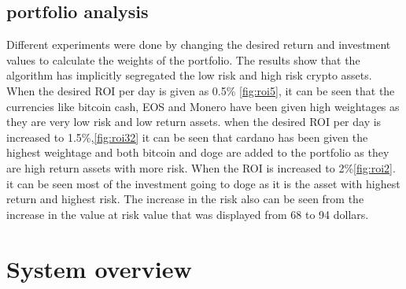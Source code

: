\documentclass[final]{cvpr}
\begin{document}
\subsection{portfolio analysis}
Different experiments were done by changing the desired return and investment values to calculate the weights of the portfolio. The results show that the algorithm has implicitly segregated the low risk and high risk crypto assets. When the desired ROI per day is given as  0.5\% \ref{fig:roi5}, it can be seen that the currencies like bitcoin cash, EOS and Monero have been given high weightages as they are very low risk and low return assets. when the desired ROI per day is increased to 1.5\%,\ref{fig:roi32} it can be seen that cardano has been given the highest weightage and both bitcoin and doge are added to the portfolio as they are high return assets with more risk. When the ROI is increased to 2\%\ref{fig:roi2}. it can be seen most of the investment going to doge as it is the asset with highest return and highest risk. The increase in the risk also can be seen from the increase in the value at risk value that was displayed from 68 to 94 dollars.

\section{System overview}
\end{document}
